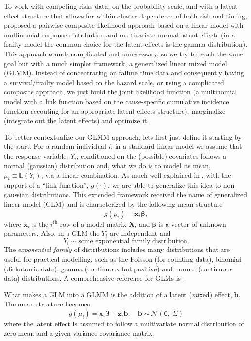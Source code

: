 To work with competing risks data, on the probability scale, and with a
latent effect structure that allows for within-cluster dependence of
both risk and timing,  proposed a pairwise composite
likelihood approach based on a linear model with multinomial response
distribution and multivariate normal latent effects (in a frailty model
the common choice for the latent effects is the gamma distribution).
This approach sounds complicated and unnecessary, so we try to reach the
same goal but with a much simpler framework, a generalized linear mixed
model (GLMM). Instead of concentrating on failure time data and
consequently having a survival/frailty model based on the hazard scale,
or using a complicated composite approach, we just build the joint
likelihood function (a multinomial model with a link function based on
the cause-specific cumulative incidence function accouting for an
appropriate latent effects structure), marginalize (integrate out the
latent effects) and optimize it.

To better contextualize our GLMM approach, lets first just define it
starting by the start. For a random individual \(i\), in a standard
linear model we assume that the response variable, \(Y_{i}\),
conditioned on the (possible) covariates follows a normal (gaussian)
distribution and, what we do is to model its mean, \(\mu_{i} \equiv
\mathbb{E}(Y_{i})\), via a linear combination. As much well explained in
, with the support of a ``link function'',
\(g(\cdot)\), we are able to generalize this idea to non-gaussian
distributions. This extended framework received the name of generalized
linear model (GLM) and is characterized by the following mean structure
\[
 g(\mu_{i}) = \bm{x}_{i}\bm{\beta},
\]
where \(\bm{x}_{i}\) is the \(i^\text{th}\) row of a model matrix
\(\bm{X}\), and \(\bm{\beta}\) is a vector of unknown parameters. Also,
in a GLM the \(Y_{i}\) are independent and
\[
  Y_{i} \sim \text{some exponential family distribution}.
\]
The \textit{exponential family} of distributions includes many
distributions that are useful for practical modelling, such as the
Poisson (for counting data), binomial (dichotomic data), gamma
(continuous but positive) and normal (continuous data) distributions. A
comprehensive reference for GLMs is .

What makes a GLM into a GLMM is the addition of a latent
(\textit{m}ixed) effect, \(\bm{b}\). The mean structure becomes
\[
  g(\mu_{i}) = \bm{x}_{i}\bm{\beta} + \bm{z}_{i}\bm{b},
  \quad \bm{b} \sim \mathcal{N}(\bm{0},~\Sigma)
\]
where the latent effect is assumed to follow a multivariate normal
distribution of zero mean and a given variance-covariance matrix.


